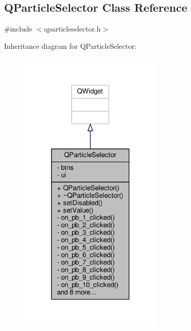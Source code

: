 \hypertarget{class_q_particle_selector}{}\subsection{Q\+Particle\+Selector Class Reference}
\label{class_q_particle_selector}


{\ttfamily \#include $<$qparticleselector.\+h$>$}



Inheritance diagram for Q\+Particle\+Selector\+:
\nopagebreak
\begin{figure}[H]
\begin{center}
\leavevmode
\includegraphics[width=194pt]{class_q_particle_selector__inherit__graph}
\end{center}
\end{figure}


